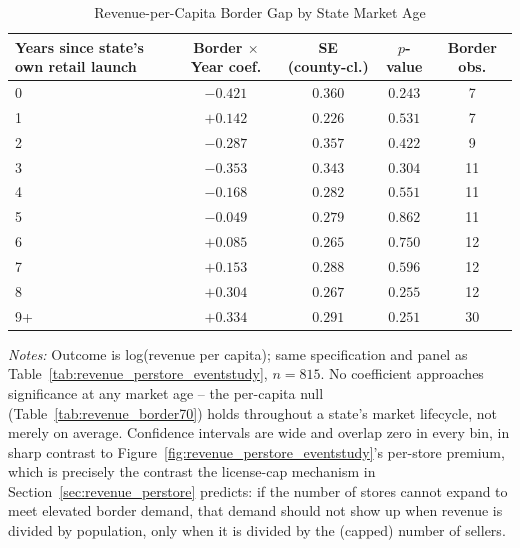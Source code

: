 \begin{table}[htbp]
\centering
\caption{Revenue-per-Capita Border Gap by State Market Age}
\label{tab:revenue_percapita_eventstudy}
\begin{tabular}{lcccc}
\toprule
Years since state's own retail launch & Border $\times$ Year coef. & SE (county-cl.) & $p$-value & Border obs.\\
\midrule
0 & $-0.421$ & $0.360$ & $0.243$ & 7 \\
1 & $+0.142$ & $0.226$ & $0.531$ & 7 \\
2 & $-0.287$ & $0.357$ & $0.422$ & 9 \\
3 & $-0.353$ & $0.343$ & $0.304$ & 11 \\
4 & $-0.168$ & $0.282$ & $0.551$ & 11 \\
5 & $-0.049$ & $0.279$ & $0.862$ & 11 \\
6 & $+0.085$ & $0.265$ & $0.750$ & 12 \\
7 & $+0.153$ & $0.288$ & $0.596$ & 12 \\
8 & $+0.304$ & $0.267$ & $0.255$ & 12 \\
9+ & $+0.334$ & $0.291$ & $0.251$ & 30 \\
\bottomrule
\end{tabular}
\begin{minipage}{0.95\textwidth}
\vspace{0.3em}
\footnotesize
\textit{Notes:} Outcome is log(revenue per capita); same specification and panel as
Table~\ref{tab:revenue_perstore_eventstudy}, $n=815$. No coefficient approaches significance at any
market age -- the per-capita null (Table~\ref{tab:revenue_border70}) holds throughout a state's market
lifecycle, not merely on average. Confidence intervals are wide and overlap zero in every bin, in sharp
contrast to Figure~\ref{fig:revenue_perstore_eventstudy}'s per-store premium, which is precisely the
contrast the license-cap mechanism in Section~\ref{sec:revenue_perstore} predicts: if the number of stores
cannot expand to meet elevated border demand, that demand should not show up when revenue is divided by
population, only when it is divided by the (capped) number of sellers.
\end{minipage}
\end{table}

